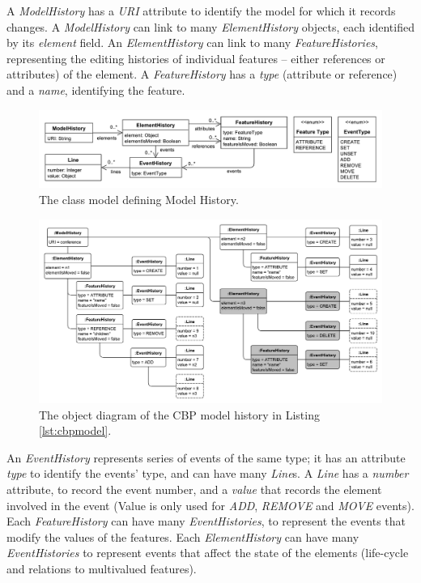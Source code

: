 \documentclass{llncs}
\begin{document}
    A \emph{ModelHistory} has a \emph{URI} attribute to identify the model for which it records changes.  A \emph{ModelHistory}  can link to many \emph{ElementHistory} objects, each identified by its \emph{element} field. 
    An \emph{ElementHistory} can link to many \emph{FeatureHistories}, representing the editing histories of individual features -- either references or attributes) of the element. 
    A \emph{FeatureHistory} has a \emph{type} (attribute or reference) and a \emph{name}, identifying the feature.
    
     \begin{figure}[ht]
\centering
\includegraphics[width=\linewidth]{object_history}
\caption{The class model defining Model History.}
\label{fig:object_history}
    \end{figure}

     \begin{figure}[ht]
\centering
\includegraphics[width=\linewidth]{history_structure}
\caption{The object diagram of the CBP model history in Listing \ref{lst:cbpmodel}.}
\label{fig:history_structure}
    \end{figure}
    
    
    An \emph{EventHistory} represents series of events of the same type; it has an attribute \emph{type} to identify the events' type, and can have many \emph{Line}s.  A \emph{Line} has a \emph{number} attribute, to record the event number, and a \emph{value} that records the element involved in the event (Value is only used for \emph{ADD}, \emph{REMOVE} and \emph{MOVE} events). Each \emph{FeatureHistory} can have many \emph{EventHistories}, to represent the events that modify the values of the features.
    Each \emph{ElementHistory} can have many \emph{EventHistories} to represent events that affect the state of the elements (life-cycle and relations to multivalued features).
    
\end{document}
